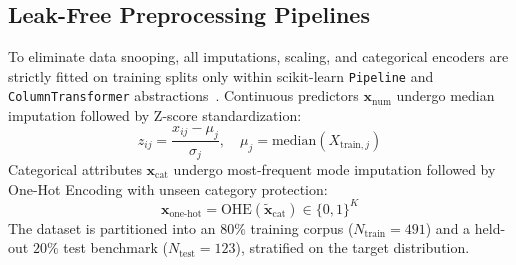\documentclass{COMPXXXX}
\begin{document}
\subsection{Leak-Free Preprocessing Pipelines}
To eliminate data snooping, all imputations, scaling, and categorical encoders are strictly fitted on training splits only within scikit-learn \texttt{Pipeline} and \texttt{ColumnTransformer} abstractions~\cite{pedregosa2011}. Continuous predictors $\mathbf{x}_{\text{num}}$ undergo median imputation followed by Z-score standardization:
\begin{equation}
z_{ij} = \frac{x_{ij} - \mu_j}{\sigma_j}, \quad \mu_j = \text{median}(X_{\text{train}, j})
\end{equation}
Categorical attributes $\mathbf{x}_{\text{cat}}$ undergo most-frequent mode imputation followed by One-Hot Encoding with unseen category protection:
\begin{equation}
\mathbf{x}_{\text{one-hot}} = \text{OHE}(\tilde{\mathbf{x}}_{\text{cat}}) \in \{0, 1\}^K
\end{equation}
The dataset is partitioned into an $80\%$ training corpus ($N_{\text{train}}=491$) and a held-out $20\%$ test benchmark ($N_{\text{test}}=123$), stratified on the target distribution.
\end{document}
